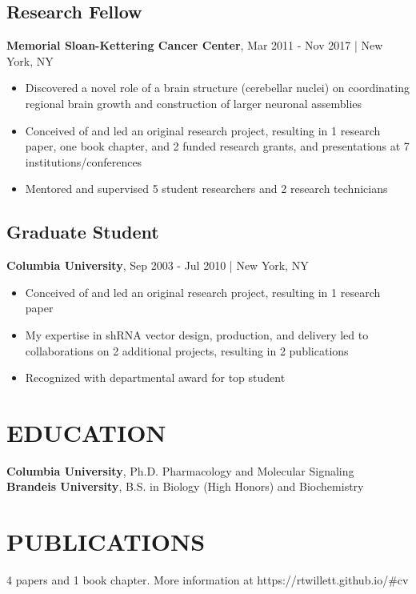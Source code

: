 \documentclass[11pt]{article}
\newenvironment{myitemize}
{ \begin{itemize}
	\setlength{\itemsep}{0pt}
	\setlength{\parskip}{0pt}
	\setlength{\parsep}{0pt}     }
{ \end{itemize}                  }
\begin{document}
\subsection*{Research Fellow}
\vspace{-3truemm}
{\bfseries Memorial Sloan-Kettering Cancer Center}, Mar 2011 - Nov 2017 | New York, NY
\begin{myitemize}
	\item Discovered a novel role of a brain structure (cerebellar nuclei) on coordinating regional brain growth and construction of larger neuronal assemblies
	\item Conceived of and led an original research project, resulting in 1 research paper, one book chapter, and 2 funded research grants, and presentations at 7 institutions/conferences
	\item Mentored and supervised 5 student researchers and 2 research technicians
\end{myitemize}

\subsection*{Graduate Student}
\vspace{-3truemm}
{\bfseries Columbia University}, Sep 2003 - Jul 2010 | New York, NY
\begin{myitemize}
	\item Conceived of and led an original research project, resulting in 1 research paper
	\item My expertise in shRNA vector design, production, and delivery led to collaborations on 2 additional projects, resulting in 2 publications
	\item Recognized with departmental award for top student
\end{myitemize}

\section*{EDUCATION}
\vspace{-3truemm}
{\bfseries Columbia University}, Ph.D. Pharmacology and Molecular Signaling \\
{\bfseries Brandeis University}, B.S. in Biology (High Honors) and Biochemistry \\

\section*{PUBLICATIONS}
\vspace{-3truemm}
4 papers and 1 book chapter. More information at https://rtwillett.github.io/\#cv
\end{document}
